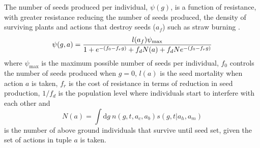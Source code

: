 \documentclass[12pt, a4paper]{article}
\begin{document}
The number of seeds produced per individual, $\psi(g)$, is a function of resistance, with greater resistance reducing the number of seeds produced, the density of surviving plants and actions that destroy seeds ($a_f$) such as straw burning \citep{Doyl1986}. 
\begin{equation}\label{eq:seed_production}
	\psi(g, a) = \frac{l(a_f)\psi_\text{max}}{1 + e^{-(f_0 - f_rg)} + f_d N(a) + f_dN e^{-(f_0 - f_rg)}}\\
\end{equation}  
where $\psi_\text{max}$ is the maximum possible number of seeds per individual, $f_0$ controls the number of seeds produced when $g = 0$, $l(a)$ is the seed mortality when action $a$ is taken, $f_r$ is the cost of resistance in terms of reduction in seed production, $1/f_d$ is the population level where individuals start to interfere with each other and 
\begin{equation}
	N(a) = \int \text{d}g~n(g, t, a_c, a_b)s(g, t|a_h, a_m)  
\end{equation}
is the number of above ground individuals that survive until seed set, given the set of actions in tuple $a$ is taken.
\end{document}
